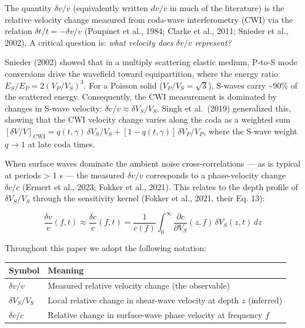\documentclass[draft]{agujournal2019}
\begin{document}
The quantity \(\delta v/v\) (equivalently written \(dv/v\) in much of
the literature) is the relative velocity change measured from coda-wave
interferometry (CWI) via the relation \(\delta t/t = -\delta v/v\)
(Poupinet et al., 1984; Clarke et al., 2011; Snieder et al., 2002). A
critical question is: \emph{what velocity does \(\delta v/v\)
represent?}

Snieder (2002) showed that in a multiply scattering elastic medium,
P-to-S mode conversions drive the wavefield toward equipartition, where
the energy ratio \(E_S/E_P = 2(V_P/V_S)^3\). For a Poisson solid
(\(V_P/V_S = \sqrt{3}\)), S-waves carry \textasciitilde{}90\% of the
scattered energy. Consequently, the CWI measurement is dominated by
changes in S-wave velocity: \(\delta v/v \approx \delta V_S/V_S\). Singh
et al.~(2019) generalized this, showing that the CWI velocity change
varies along the coda as a weighted sum
\([\delta V/V]_{\text{CWI}} = q(t,\gamma)\,\delta V_S/V_S + [1-q(t,\gamma)]\,\delta V_P/V_P\),
where the S-wave weight \(q \to 1\) at late coda times.

When surface waves dominate the ambient noise cross-correlations --- as
is typical at periods \textgreater{} 1 s --- the measured \(\delta v/v\)
corresponds to a phase-velocity change \(\delta c/c\) (Ermert et al.,
2023; Fokker et al., 2021). This relates to the depth profile of
\(\delta V_S / V_S\) through the sensitivity kernel (Fokker et al.,
2021, their Eq. 13):

\[\frac{\delta v}{v}(f, t) \approx \frac{\delta c}{c}(f, t) = \frac{1}{c(f)} \int_0^\infty \frac{\partial c}{\partial V_S}(z, f) \, \delta V_S(z, t) \, dz \tag{1}\]

Throughout this paper we adopt the following notation:

{\def\LTcaptype{none} %
\begin{longtable}[]{@{}
  >{\raggedright\arraybackslash}p{}
  >{\raggedright\arraybackslash}p{}@{}}
\toprule\noalign{}
\begin{minipage}[b]{\linewidth}\raggedright
Symbol
\end{minipage} & \begin{minipage}[b]{\linewidth}\raggedright
Meaning
\end{minipage} \\
\midrule\noalign{}
\endhead
\bottomrule\noalign{}
\endlastfoot
\(\delta v / v\) & Measured relative velocity change (the observable) \\
\(\delta V_S / V_S\) & Local relative change in shear-wave velocity at
depth \(z\) (inferred) \\
\(\delta c / c\) & Relative change in surface-wave phase velocity at
frequency \(f\) \\
\end{longtable}
}
\end{document}
